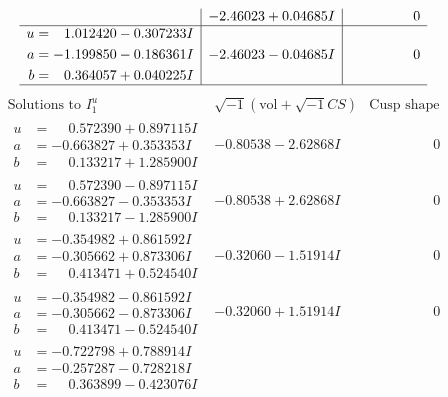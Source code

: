 \documentclass[1p]{elsarticle_modified}
\theoremstyle{definition}
\newcommand{\I}{\sqrt{-1}}
\begin{document}
$$\begin{array}{c|c|c}
 & -2.46023 + 0.04685 I & \phantom{-0.000000 } 0 \\ \hline\begin{aligned}
u &= \phantom{-}1.012420 - 0.307233 I \\
a &= -1.199850 - 0.186361 I \\
b &= \phantom{-}0.364057 + 0.040225 I\end{aligned}
 & -2.46023 - 0.04685 I & \phantom{-0.000000 } 0\\
 \hline 
 \end{array}$$\newpage$$\begin{array}{c|c|c}  
\text{Solutions to }I^u_{1}& \I (\text{vol} + \sqrt{-1}CS) & \text{Cusp shape}\\
 \hline 
\begin{aligned}
u &= \phantom{-}0.572390 + 0.897115 I \\
a &= -0.663827 + 0.353353 I \\
b &= \phantom{-}0.133217 + 1.285900 I\end{aligned}
 & -0.80538 - 2.62868 I & \phantom{-0.000000 } 0 \\ \hline\begin{aligned}
u &= \phantom{-}0.572390 - 0.897115 I \\
a &= -0.663827 - 0.353353 I \\
b &= \phantom{-}0.133217 - 1.285900 I\end{aligned}
 & -0.80538 + 2.62868 I & \phantom{-0.000000 } 0 \\ \hline\begin{aligned}
u &= -0.354982 + 0.861592 I \\
a &= -0.305662 + 0.873306 I \\
b &= \phantom{-}0.413471 + 0.524540 I\end{aligned}
 & -0.32060 - 1.51914 I & \phantom{-0.000000 } 0 \\ \hline\begin{aligned}
u &= -0.354982 - 0.861592 I \\
a &= -0.305662 - 0.873306 I \\
b &= \phantom{-}0.413471 - 0.524540 I\end{aligned}
 & -0.32060 + 1.51914 I & \phantom{-0.000000 } 0 \\ \hline\begin{aligned}
u &= -0.722798 + 0.788914 I \\
a &= -0.257287 - 0.728218 I \\
b &= \phantom{-}0.363899 - 0.423076 I\end{aligned}

\end{array}$$
\end{document}
